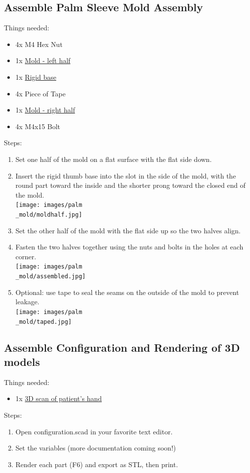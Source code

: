 \documentclass[11pt]{article}
\begin{document}
\subsection{Assemble Palm Sleeve Mold Assembly}
Things needed:
\begin{itemize}
\item 4x M4 Hex Nut
\item 1x \hyperlink{thing_mold\_left\_half}{Mold - left half}
\item 1x \hyperlink{thing_rigid\_base}{Rigid base}
\item 4x Piece of Tape
\item 1x \hyperlink{thing_mold\_right\_half}{Mold - right half}
\item 4x M4x15 Bolt
\end{itemize}
Steps:
\begin{enumerate}
\item Set one half of the mold on a flat surface with the flat side down.
\item Insert the rigid thumb base into the slot in the side of the mold, with the round part toward the inside and the shorter prong toward the closed end of the mold.\\ \texttt{[image: images/palm\\\_mold/moldhalf.jpg]}
\item Set the other half of the mold with the flat side up so the two halves align.
\item Fasten the two halves together using the nuts and bolts in the holes at each corner.\\ \texttt{[image: images/palm\\\_mold/assembled.jpg]}
\item Optional: use tape to seal the seams on the outside of the mold to prevent leakage.\\ \texttt{[image: images/palm\\\_mold/taped.jpg]}
\end{enumerate}

\subsection{Assemble Configuration and Rendering of 3D models}
Things needed:
\begin{itemize}
\item 1x \hyperlink{thing_hand\_scan}{3D scan of patient's hand}
\end{itemize}
Steps:
\begin{enumerate}
\item Open configuration.scad in your favorite text editor.
\item Set the variables (more documentation coming soon!)
\item Render each part (F6) and export as STL, then print.
\end{enumerate}
\end{document}
